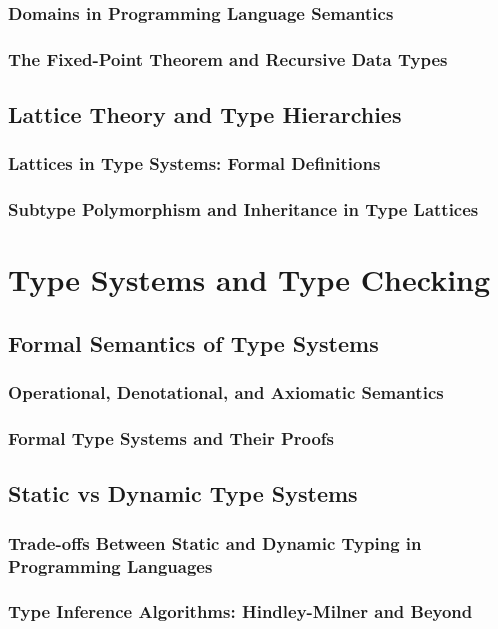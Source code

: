 \documentclass[12pt, oneside]{book}
\begin{document}
\subsubsection{Domains in Programming Language Semantics}
\subsubsection{The Fixed-Point Theorem and Recursive Data Types}
\subsection{Lattice Theory and Type Hierarchies}
\subsubsection{Lattices in Type Systems: Formal Definitions}
\subsubsection{Subtype Polymorphism and Inheritance in Type Lattices}

\section{Type Systems and Type Checking}
\subsection{Formal Semantics of Type Systems}
\subsubsection{Operational, Denotational, and Axiomatic Semantics}
\subsubsection{Formal Type Systems and Their Proofs}
\subsection{Static vs Dynamic Type Systems}
\subsubsection{Trade-offs Between Static and Dynamic Typing in Programming Languages}
\subsubsection{Type Inference Algorithms: Hindley-Milner and Beyond}
\end{document}
